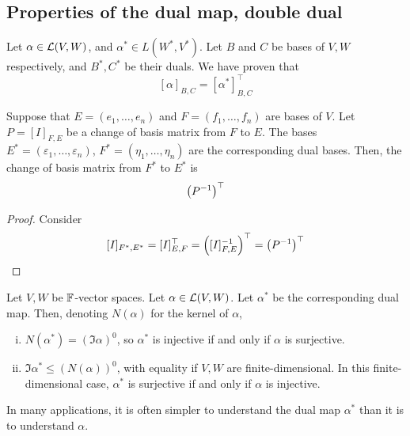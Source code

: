 \documentclass[a4paper]{article}
\begin{document}
\subsection{Properties of the dual map, double dual}

Let $ \alpha \in {\mathcal{L}}(V,W) $, and $ \alpha^* \in L(W^*, V^*) $.
Let $ B $ and $ C $ be bases of $ V, W $ respectively, and $ B^*, C^* $ be their duals.
We have proven that
\[
	[\alpha]_{B,C} = [\alpha^*]^\top_{B,C}
\]
\begin{lemma}
	Suppose that $ E = (e_1, \dots, e_n) $ and $ F = (f_1, \dots, f_n) $ are bases of $ V $.
	Let $ P = [I]_{F, E} $ be a change of basis matrix from $ F $ to $ E $.
	The bases $ E^* = (\varepsilon_1, \dots, \varepsilon_n) $, $ F^* = (\eta_1, \dots, \eta_n) $ are the corresponding dual bases.
	Then, the change of basis matrix from $ F^* $ to $ E^* $ is
	\[
		\qty(P^{-1})^\top
	\]
\end{lemma}
\begin{proof}
	Consider
	\[
		[I]_{F^*, E^*} = [I]^\top_{E, F} = \qty([I]_{F, E}^{-1})^\top = \qty(P^{-1})^\top
	\]
\end{proof}
\begin{lemma}
	Let $ V, W $ be $ {\mathbb{F}} $-vector spaces.
	Let $ \alpha \in {\mathcal{L}}(V, W) $.
	Let $ \alpha^* $ be the corresponding dual map.
	Then, denoting $ N(\alpha) $ for the kernel of $ \alpha $,
	\begin{enumerate}[(i)]
		\item $ N(\alpha^*) = (\Im \alpha)^0 $, so $ \alpha^* $ is injective if and only if $ \alpha $ is surjective.
		\item $ \Im \alpha^* \leq (N(\alpha))^0 $, with equality if $ V, W $ are finite-dimensional.
		      In this finite-dimensional case, $ \alpha^* $ is surjective if and only if $ \alpha $ is injective.
	\end{enumerate}
\end{lemma}
\begin{remark}
	In many applications, it is often simpler to understand the dual map $ \alpha^* $ than it is to understand $ \alpha $.
\end{remark}
\end{document}
